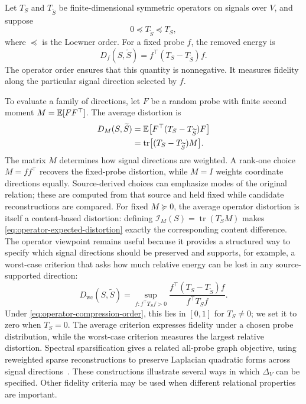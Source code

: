 Let $T_S$ and $T_{\widetilde S}$ be finite-dimensional symmetric operators on signals over $V$, and suppose
\begin{equation}
0\preceq T_{\widetilde S}\preceq T_S,
\label{eq:operator-compression-order}
\end{equation}
where $\preceq$ is the Loewner order.
For a fixed probe $f$, the removed energy is
\begin{equation}
D_f(S,\widetilde S)
=f^\top(T_S-T_{\widetilde S})f.
\label{eq:operator-probe-distortion}
\end{equation}
The operator order ensures that this quantity is nonnegative.
It measures fidelity along the particular signal direction selected by $f$.

To evaluate a family of directions, let $F$ be a random probe with finite second moment $M=\mathbb{E}[FF^\top]$.
The average distortion is
\begin{equation}
\begin{aligned}
D_M(S,\widetilde S)
&=\mathbb{E}\bigl[F^\top(T_S-T_{\widetilde S})F\bigr]\\
&=\operatorname{tr}\bigl[(T_S-T_{\widetilde S})M\bigr].
\end{aligned}
\label{eq:operator-expected-distortion}
\end{equation}
The matrix $M$ determines how signal directions are weighted.
A rank-one choice $M=ff^\top$ recovers the fixed-probe distortion, while $M=I$ weights coordinate directions equally.
Source-derived choices can emphasize modes of the original relation; these are computed from that source and held fixed while candidate reconstructions are compared.
For fixed $M\succeq0$, the average operator distortion is itself a content-based distortion: defining $\mathcal I_M(S)=\operatorname{tr}(T_SM)$ makes \cref{eq:operator-expected-distortion} exactly the corresponding content difference.
The operator viewpoint remains useful because it provides a structured way to specify which signal directions should be preserved and supports, for example, a worst-case criterion that asks how much relative energy can be lost in any source-supported direction:
\begin{equation}
D_{\mathrm{wc}}(S,\widetilde S)
=\sup_{f:f^\top T_Sf>0}
\frac{f^\top(T_S-T_{\widetilde S})f}{f^\top T_Sf}.
\label{eq:operator-worst-case-distortion}
\end{equation}
Under \cref{eq:operator-compression-order}, this lies in $[0,1]$ for $T_S\ne0$; we set it to zero when $T_S=0$.
The average criterion expresses fidelity under a chosen probe distribution, while the worst-case criterion measures the largest relative distortion.
Spectral sparsification gives a related all-probe graph objective, using reweighted sparse reconstructions to preserve Laplacian quadratic forms across signal directions~\citep{spielman2011effective}.
These constructions illustrate several ways in which $\Delta_V$ can be specified.
Other fidelity criteria may be used when different relational properties are important.
